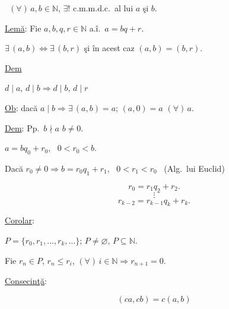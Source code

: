 \documentclass[12pt]{article}
\begin{document}
\noindent{} \ $(\forall)\,a,b\in\mathbb{N}$, $\exists!$ c.m.m.d.c.\ al lui $a$ şi $b$.

\bigskip
\noindent\underline{Lemă}: Fie $a,b,q,r\in\mathbb{N}$ a.î.\ $a=bq+r$.

\noindent $\exists\,(a,b) \Leftrightarrow \exists\,(b,r)$ şi în acest caz $(a,b)=(b,r)$.

\bigskip
\noindent\underline{Dem}

\noindent $d\mid a$, $d\mid b \Rightarrow d\mid b$, $d\mid r$

\bigskip
\noindent\underline{Ob}: dacă $a\mid b \Rightarrow \exists\,(a,b)=a$; $(a,0)=a$ $(\forall)\,a$.

\bigskip
\noindent\underline{Dem}: Pp.\ $b\nmid a$ \quad $b\neq 0$.

\noindent $a=bq_0+r_0$, \ $0<r_0<b$.

\noindent Dacă $r_0\neq 0 \Rightarrow b=r_0q_1+r_1$, \ $0<r_1<r_0$ \ (Alg.\ lui Euclid)

\[
r_0=r_1q_2+r_2.
\]
\[
\vdots
\]
\[
r_{k-2}=r_{k-1}q_k+r_k.
\]

\bigskip
\noindent\underline{Corolar}:

\noindent $P=\{r_0,r_1,\ldots,r_k,\ldots\}$; $P\neq\varnothing$, $P\subseteq\mathbb{N}$.

\noindent Fie $r_n\in P$, $r_n\leq r_i$, $(\forall)\,i\in\mathbb{N} \Rightarrow r_{n+1}=0$.

\bigskip
\noindent\underline{Consecinţă}:

\[
(ca,cb)=c(a,b)
\]
\end{document}
